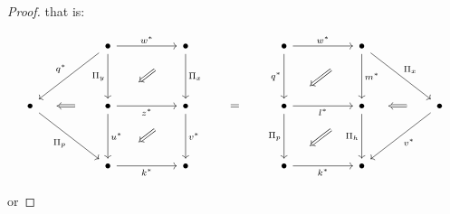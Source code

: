 \documentclass[10pt, oneside]{article}
\begin{document}
\begin{proof}
	\noindent that is:
	
	\[\begin{tikzcd}
		&& \bullet && \bullet && \bullet && \bullet \\
		\\
		\bullet && \bullet && \bullet & {=} & \bullet && \bullet && \bullet \\
		\\
		&& \bullet && \bullet && \bullet && \bullet
		\arrow["{\Pi_y}"', from=1-3, to=3-3]
		\arrow["{z^\ast}"', from=3-3, to=3-5]
		\arrow["{\Pi_x}", from=1-5, to=3-5]
		\arrow["{w^\ast}", from=1-3, to=1-5]
		\arrow[shorten <=22pt, shorten >=22pt, Rightarrow, from=1-5, to=3-3]
		\arrow["{k^\ast}"', from=5-3, to=5-5]
		\arrow["{u^\ast}", from=3-3, to=5-3]
		\arrow["{\Pi_p}"', from=3-1, to=5-3]
		\arrow["{q^\ast}"', from=1-3, to=3-1]
		\arrow[shorten <=19pt, shorten >=14pt, Rightarrow, from=3-3, to=3-1]
		\arrow["{v^\ast}", from=3-5, to=5-5]
		\arrow[shorten <=22pt, shorten >=22pt, Rightarrow, from=3-5, to=5-3]
		\arrow["{\Pi_p}"', from=3-7, to=5-7]
		\arrow["{k^\ast}"', from=5-7, to=5-9]
		\arrow["{\Pi_h}"', from=3-9, to=5-9]
		\arrow["{l^\ast}"', from=3-7, to=3-9]
		\arrow[shorten <=22pt, shorten >=17pt, Rightarrow, from=3-9, to=5-7]
		\arrow["{q^\ast}"', from=1-7, to=3-7]
		\arrow["{m^\ast}", from=1-9, to=3-9]
		\arrow["{w^\ast}", from=1-7, to=1-9]
		\arrow[shorten <=22pt, shorten >=17pt, Rightarrow, from=1-9, to=3-7]
		\arrow["{\Pi_x}", from=1-9, to=3-11]
		\arrow["{v^\ast}", from=3-11, to=5-9]
		\arrow[shorten <=19pt, shorten >=14pt, Rightarrow, from=3-11, to=3-9]
	\end{tikzcd}\]
	
	\noindent or
	

\end{proof}
\end{document}
